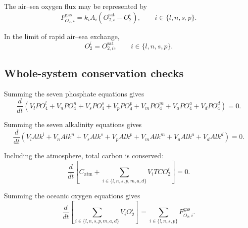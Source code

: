 \documentclass[11pt]{article}
\begin{document}
The air--sea oxygen flux may be represented by
\begin{equation}
F^{\mathrm{gas}}_{O_2,i}
=
k_iA_i
\left(
O_{2,i}^{\mathrm{sat}}-O_2^i
\right),
\qquad
i\in\{l,n,s,p\}.
\label{eq:seven_o2_gas_flux}
\end{equation}

In the limit of rapid air--sea exchange,
\begin{equation}
O_2^i=O_{2,i}^{\mathrm{sat}},
\qquad
i\in\{l,n,s,p\}.
\label{eq:seven_o2_saturation}
\end{equation}

\subsection{Whole-system conservation checks}

Summing the seven phosphate equations gives
\begin{equation}
\frac{d}{dt}
\left(
V_lPO_4^l
+
V_nPO_4^n
+
V_sPO_4^s
+
V_pPO_4^p
+
V_mPO_4^m
+
V_aPO_4^a
+
V_dPO_4^d
\right)
=
0.
\label{eq:seven_total_po4}
\end{equation}

Summing the seven alkalinity equations gives
\begin{equation}
\frac{d}{dt}
\left(
V_lAlk^l
+
V_nAlk^n
+
V_sAlk^s
+
V_pAlk^p
+
V_mAlk^m
+
V_aAlk^a
+
V_dAlk^d
\right)
=
0.
\label{eq:seven_total_alk}
\end{equation}

Including the atmosphere, total carbon is conserved:
\begin{equation}
\frac{d}{dt}
\left[
C_{\mathrm{atm}}
+
\sum_{i\in\{l,n,s,p,m,a,d\}}
V_iTCO_2^i
\right]
=
0.
\label{eq:seven_total_carbon}
\end{equation}

Summing the oceanic oxygen equations gives
\begin{equation}
\frac{d}{dt}
\left[
\sum_{i\in\{l,n,s,p,m,a,d\}}
V_iO_2^i
\right]
=
\sum_{i\in\{l,n,s,p\}}
F^{\mathrm{gas}}_{O_2,i}.
\label{eq:seven_total_o2}
\end{equation}
\end{document}
